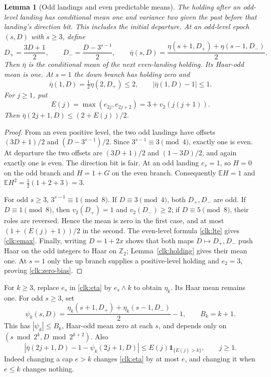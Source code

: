 \documentclass[11pt]{amsart}
\newtheorem{lemma}[theorem]{Lemma}
\theoremstyle{definition}
\theoremstyle{remark}
\newcommand{\E}{\mathbb E}
\newcommand{\Ztwo}{\mathbb Z_2}
\newcommand{\one}{\mathbf 1}
\begin{document}
\begin{lemma}[Odd landings and even predictable means]\label{clk:balance}
The holding after an odd-level landing has conditional mean one and
variance two given the past before that landing's direction bit. This
includes the initial departure. At an odd-level epoch $(s,D)$ with
$s\ge3$, define
\[
 D_+=\frac{3D+1}{2},\qquad D_- =\frac{D-3^{s-1}}2,\qquad
 \bar\eta(s,D)=\frac{\eta(s+1,D_+)+\eta(s-1,D_-)}2.
\]
Then $\bar\eta$ is the conditional mean of the next even-landing
holding. Its Haar-odd mean is one. At $s=1$ the down branch has holding
zero and
\begin{equation}\label{clk:zero-bias}
 \bar\eta(1,D)=\tfrac12\eta(2,D_+)\le2,
 \qquad |\bar\eta(1,D)-1|\le1.
\end{equation}
For $j\ge1$, put
\begin{equation}\label{clk:emax}
 E(j)=\max(e_{2j},e_{2j+2})=3+v_2(j(j+1)).
\end{equation}
Then $\bar\eta(2j+1,D)\le(2+E(j))/2$.
\end{lemma}
\begin{proof}
From an even positive level, the two odd landings have offsets
$(3D+1)/2$ and $(D-3^{s-1})/2$. Since $3^{s-1}\equiv3\pmod4$,
exactly one is even. At departure the two offsets are
$(3D+1)/2$ and $(1-3D)/2$, and again exactly one is even.
The direction bit is fair. At an odd landing $e_s=1$, so $H=0$ on
the odd branch and $H=1+G$ on the even branch. Consequently
$\E H=1$ and $\E H^2=\tfrac12(1+2+3)=3$.

For odd $s\ge3$, $3^{s-1}\equiv1\pmod8$. If $D\equiv3\pmod4$,
both $D_+,D_-$ are odd. If $D\equiv1\pmod8$, then
$v_2(D_+)=1$ and $v_2(D_-)\ge2$; if $D\equiv5\pmod8$, their
roles are reversed. Hence the mean is zero in the first case, and at
most $(1+(E(j)+1))/2$ in the second. The even-level formula
\eqref{clk:lte} gives \eqref{clk:emax}. Finally, writing $D=1+2x$
shows that both maps $D\mapsto D_+,D_-$ push Haar on the odd
integers to Haar on $\Ztwo$; Lemma~\ref{clk:holding} gives their mean
one. At $s=1$ only the up branch supplies a positive-level holding and
$e_2=3$, proving \eqref{clk:zero-bias}.
\end{proof}

For $k\ge3$, replace $e_s$ in \eqref{clk:eta} by $e_s\wedge k$ to
obtain $\eta_k$. Its Haar mean remains one. For odd $s\ge3$, set
\begin{equation}\label{clk:psi}
 \psi_k(s,D)=\frac{\eta_k(s+1,D_+)+\eta_k(s-1,D_-)}2-1,
 \qquad B_k=k+1.
\end{equation}
This has $|\psi_k|\le B_k$, Haar-odd mean zero at each $s$, and depends
only on $(s\bmod2^k,D\bmod2^{k+2})$. Also
\begin{equation}\label{clk:cap-error}
 |\bar\eta(2j+1,D)-1-\psi_k(2j+1,D)|
       \le E(j)\one_{\{E(j)>k\}},\qquad j\ge1.
\end{equation}
Indeed changing a cap $e>k$ changes \eqref{clk:eta} by at most $e$,
and changing it when $e\le k$ changes nothing.
\end{document}
